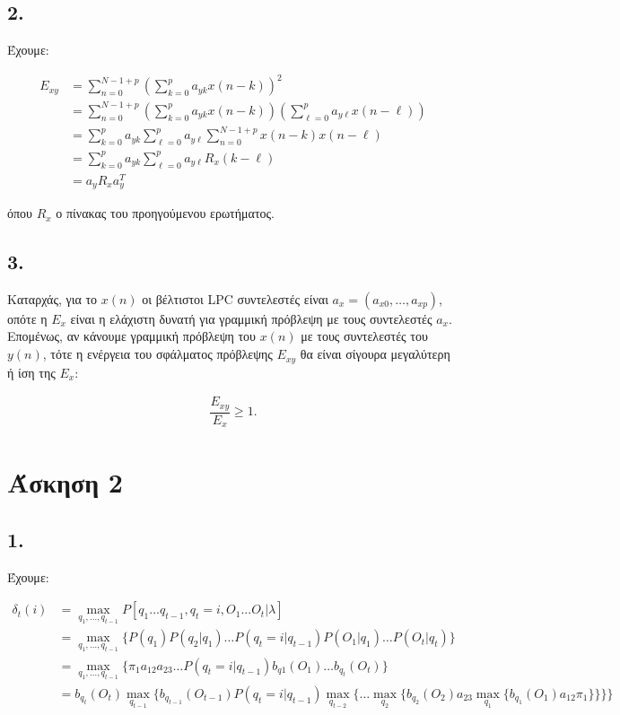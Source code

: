 \documentclass[12pt,a4paper]{article}
\begin{document}
		\subsection*{2.}
			Έχουμε:
			
			\begin{align*}
				E_{xy} &= \sum_{n=0}^{N-1+p} \left(\sum_{k=0}^{p}a_{yk}x\left(n-k\right)\right)^2 \\
				&= \sum_{n=0}^{N-1+p}\left(\sum_{k=0}^{p}a_{yk}x\left(n-k\right)\right)\left(\sum_{\ell=0}^{p}a_{y\ell}x\left(n-\ell\right)\right) \\
				&= \sum_{k=0}^{p}a_{yk}\sum_{\ell=0}^{p}a_{y\ell}\sum_{n=0}^{N-1+p}x\left(n-k\right)x\left(n-\ell\right) \\
				&= \sum_{k=0}^{p}a_{yk}\sum_{\ell=0}^{p}a_{y\ell}R_x\left(k-\ell\right) \\
				&= a_yR_xa_y^T
			\end{align*}
			
			όπου $R_x$ ο πίνακας του προηγούμενου ερωτήματος.
		
		\subsection*{3.}
			Καταρχάς, για το $x\left(n\right)$ οι βέλτιστοι LPC συντελεστές είναι $a_x = \left(a_{x0}, \dots, a_{xp}\right)$, οπότε η $E_x$ είναι η ελάχιστη δυνατή για γραμμική πρόβλεψη με τους συντελεστές $a_x$. Επομένως, αν κάνουμε γραμμική πρόβλεψη του $x\left(n\right)$ με τους συντελεστές του $y\left(n\right)$, τότε η ενέργεια του σφάλματος πρόβλεψης $E_{xy}$ θα είναι σίγουρα μεγαλύτερη ή ίση της $E_x$:
			
			\begin{align*}
				\dfrac{E_{xy}}{E_x} \geq 1.
			\end{align*}
	
	\section*{Άσκηση 2} 
		
		\subsection*{1.}
			Έχουμε:
			
			\begin{align*}
				\delta_t\left(i\right) &= \max_{q_1, \dots, q_{t-1}} P\left[q_1...q_{t-1}, q_t=i, O_1...O_t|\lambda\right] \\
				&= \max_{q_1, \dots, q_{t-1}} \{P\left(q_1\right)P\left(q_2|q_1\right) \dots P\left(q_t=i|q_{t-1}\right)P\left(O_1|q_1\right)\dots P\left(O_t|q_t\right)\} \\
				&= \max_{q_1, \dots, q_{t-1}} \{\pi_1 a_{12} a_{23} \dots P\left(q_t=i|q_{t-1}\right)b_{q1}\left(O_1\right)\dots b_{q_t}\left(O_t\right)\} \\
				&= b_{q_t}\left(O_t\right)\max_{q_{t-1}}\{b_{q_{t-1}}\left(O_{t-1}\right)P\left(q_t=i|q_{t-1}\right)\max_{q_{t-2}}\{\dots \max_{q_2}\{b_{q_2}\left(O_2\right)a_{23}\max_{q_1}\{b_{q_1}\left(O_1\right)a_{12}\pi_1\}\}\}\}
			\end{align*}
			
\end{document}

